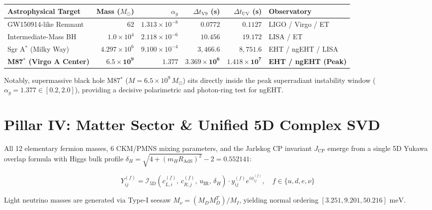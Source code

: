 \documentclass[11pt, a4paper]{article}
\begin{document}
\begin{center}
{\small
\setlength{\tabcolsep}{4.5pt}
\begin{tabular}{p{4.3cm} r r r r p{3.0cm}}
\toprule
\textbf{Astrophysical Target} & \textbf{Mass ($M_\odot$)} & \textbf{$\alpha_g$} & \textbf{$\Delta t_{\text{V9}}$ (s)} & \textbf{$\Delta t_{\text{UV}}$ (s)} & \textbf{Observatory} \\
\midrule
GW150914-like Remnant & $62$ & $1.313 \times 10^{-8}$ & $0.0772$ & $0.1127$ & LIGO / Virgo / ET \\
\rowcolor{rowtint}
Intermediate-Mass BH & $1.0 \times 10^4$ & $2.118 \times 10^{-6}$ & $10.456$ & $19.172$ & LISA / ET \\
Sgr A$^*$ (Milky Way) & $4.297 \times 10^6$ & $9.100 \times 10^{-4}$ & $3,466.6$ & $8,751.6$ & EHT / ngEHT / LISA \\
\rowcolor{rowtint}
\textbf{M87$^*$ (Virgo A Center)} & $\mathbf{6.5 \times 10^9}$ & $\mathbf{1.377}$ & $\mathbf{3.369 \times 10^6}$ & $\mathbf{1.418 \times 10^7}$ & \textbf{EHT / ngEHT (Peak)} \\
\bottomrule
\end{tabular}
}
\end{center}

Notably, supermassive black hole M87$^*$ ($M = 6.5 \times 10^9\,M_\odot$) sits directly inside the peak superradiant instability window ($\alpha_g = 1.377 \in [0.2, 2.0]$), providing a decisive polarimetric and photon-ring test for ngEHT.

\section{Pillar IV: Matter Sector \& Unified 5D Complex SVD}

All 12 elementary fermion masses, 6 CKM/PMNS mixing parameters, and the Jarlskog CP invariant $J_{\text{CP}}$ emerge from a single 5D Yukawa overlap formula with Higgs bulk profile $\delta_H = \sqrt{4 + (m_H R_{\text{AdS}})^2} - 2 = 0.552141$:

\begin{equation}
Y_{ij}^{(f)} = \mathcal{I}_{5\text{D}}\!\left(c_{L,i}^{(f)},\, c_{R,j}^{(f)},\, u_{\text{IR}},\, \delta_H\right) \cdot y_{ij}^{(f)} e^{i\phi_{ij}^{(f)}}, \quad f \in \{u, d, e, \nu\}
\end{equation}

Light neutrino masses are generated via Type-I seesaw $M_\nu = (M_D M_D^T)/M_I$, yielding normal ordering $[3.251, 9.201, 50.216]\text{ meV}$.
\end{document}
